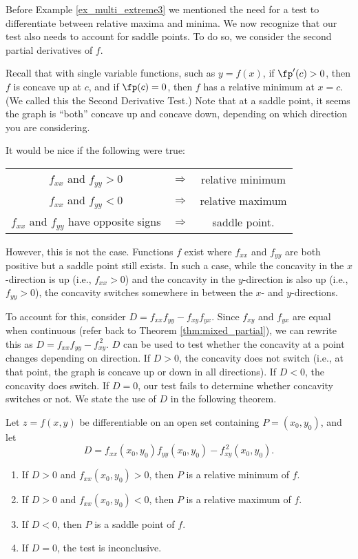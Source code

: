 Before Example \ref{ex_multi_extreme3} we mentioned the need for a test to differentiate between relative maxima and minima. We now recognize that our test also needs to account for saddle points. To do so, we consider the second partial derivatives of $f$.

Recall that with single variable functions, such as $y=f(x)$, if $\fp'(c)>0$, then $f$ is concave up at $c$, and if $\fp(c) =0$, then $f$ has a relative minimum at $x=c$. (We called this the Second Derivative Test.) Note that at a saddle point, it seems the graph is ``both'' concave up and concave down, depending on which direction you are considering.

It would be nice if the following were true:
\begin{center}
	\begin{tabular}{ccc}
	$f_{xx}$ and $f_{yy} >0$ & $\Rightarrow$ & relative minimum\\
	$f_{xx}$ and $f_{yy} <0$ & $\Rightarrow$ & relative maximum\\
	$f_{xx}$ and $f_{yy}$ have opposite signs & $\Rightarrow$ & saddle point.
	\end{tabular}
\end{center}

However, this is not the case. Functions $f$ exist where $f_{xx}$ and $f_{yy}$ are both positive  but a saddle point still exists. In such a case, while the concavity in the $x$-direction is up (i.e., $f_{xx}>0$) and the concavity in the $y$-direction is also up (i.e., $f_{yy}>0$), the concavity switches somewhere in between the $x$- and $y$-directions.

To account for this, consider $D = f_{xx}f_{yy}-f_{xy}f_{yx}$. Since $f_{xy}$ and $f_{yx}$ are equal when continuous (refer back to Theorem \ref{thm:mixed_partial}), we can rewrite this as $D = f_{xx}f_{yy}-f_{xy}^{\,2}$. $D$ can be used to test whether the concavity at a point changes depending on direction. If $D>0$, the concavity does not switch (i.e., at that point, the graph is concave up or down in all directions). If $D<0$, the concavity does switch. If $D=0$, our test fails to determine whether concavity switches or not. We state the use of $D$ in the following theorem.

{Let $z=f(x,y)$ be differentiable on an open set containing $P = (x_0,y_0)$, and let 
$$D = f_{xx}(x_0,y_0)f_{yy}(x_0,y_0)-f_{xy}^{\,2}(x_0,y_0).$$
\begin{enumerate}
	\item If $D>0$ and $f_{xx}(x_0,y_0)>0$, then $P$ is a relative minimum of $f$.
	\item If $D>0$ and $f_{xx}(x_0,y_0)<0$, then $P$ is a relative maximum of $f$.
	\item	If $D<0$, then $P$ is a saddle point of $f$.
	\item If $D=0$, the test is inconclusive.
\end{enumerate}
}


